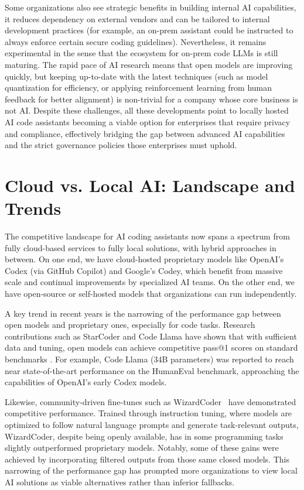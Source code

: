Some organizations also see strategic benefits in building internal \gls{AI} capabilities, it reduces dependency on external vendors and can be tailored to internal development practices (for example, an on-prem assistant could be instructed to always enforce certain secure coding guidelines). Nevertheless, it remains experimental in the sense that the ecosystem for on-prem code \glspl{LLM} is still maturing. The rapid pace of \gls{AI} research means that open models are improving quickly, but keeping up-to-date with the latest techniques (such as model quantization for efficiency, or applying reinforcement learning from human feedback for better alignment) is non-trivial for a company whose core business is not \gls{AI}. Despite these challenges, all these developments point to locally hosted \gls{AI} code assistants becoming a viable option for enterprises that require privacy and compliance, effectively bridging the gap between advanced \gls{AI} capabilities and the strict governance policies those enterprises must uphold.

\section{Cloud vs. Local AI: Landscape and Trends}
\label{sec:ai-trends}
The competitive landscape for \gls{AI} coding assistants now spans a spectrum from fully cloud-based services to fully local solutions, with hybrid approaches in between. On one end, we have cloud-hosted proprietary models like OpenAI’s Codex (via GitHub Copilot) and Google’s Codey, which benefit from massive scale and continual improvements by specialized \gls{AI} teams. On the other end, we have open-source or self-hosted models that organizations can run independently.

A key trend in recent years is the narrowing of the performance gap between open models and proprietary ones, especially for code tasks. Research contributions such as StarCoder and Code Llama have shown that with sufficient data and tuning, open models can achieve competitive pass@1 scores on standard benchmarks \autocite{Li2023StarCoder}. For example, Code Llama (34B parameters) was reported to reach near state-of-the-art performance on the HumanEval benchmark, approaching the capabilities of OpenAI’s early Codex models.

Likewise, community-driven fine-tunes such as WizardCoder~\autocite{Luo2023} have demonstrated competitive performance. Trained through instruction tuning, where models are optimized to follow natural language prompts and generate task-relevant outputs, WizardCoder, despite being openly available, has in some programming tasks slightly outperformed proprietary models. Notably, some of these gains were achieved by incorporating filtered outputs from those same closed models. This narrowing of the performance gap has prompted more organizations to view local \gls{AI} solutions as viable alternatives rather than inferior fallbacks.

